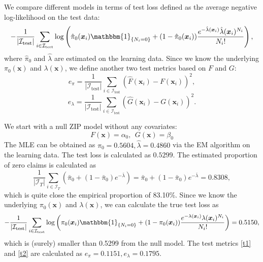 \documentclass[11pt]{article}
\numberwithin{equation}{section}
\def\bx{\boldsymbol{x}}
\begin{document}
We compare different models in terms of test loss defined as the average negative log-likelihood on the test data:
\begin{equation}
-\frac{1}{|\mathcal{I}_\text{test}|}\sum_{i\in\mathcal{I}_\text{test}}\log \left(\hat{\pi}_0(\bx_i)\mathbbm{1}_{\{N_i=0\}} + 
(1-\hat{\pi}_0(\bx_i))\frac{e^{-\hat{\lambda}(\bx_i)}\hat{\lambda}(\bx_i)^{N_i}}{N_i!}\right),
\end{equation} 
where $\hat{\pi}_0$ and $\hat{\lambda}$ are estimated on the learning data. 
Since we know the underlying $\pi_0(\bx)$ and $\lambda(\bx)$, we define another two test metrics based on $F$ and $G$:
\begin{equation}\label{t1}
e_\pi=\frac{1}{|\mathcal{I}_\text{test}|}\sum_{i\in\mathcal{I}_\text{test}}(\hat{F}(\bx_i)-F(\bx_i))^2,
\end{equation}
\begin{equation}\label{t2}
e_\lambda=\frac{1}{|\mathcal{I}_\text{test}|}\sum_{i\in\mathcal{I}_\text{test}}(\hat{G}(\bx_i)-G(\bx_i))^2.
\end{equation}


We start with a null ZIP model without any covariates:
\begin{equation}\label{zip-null}
F(\bx)=\alpha_0, ~~G(\bx)=\beta_0 
\end{equation}
The MLE can be obtained as $\hat{\pi}_0=0.5604, \hat{\lambda}=0.4860$ via the EM algorithm on the learning data.
The test loss is calculated as $0.5299$. 
The estimated proportion of zero claims is calculated as 
$$\frac{1}{|\mathcal{I}_T|}\sum_{i\in\mathcal{I}_T}\left(\bar{\pi}_0+(1-\bar{\pi}_0)e^{-\bar{\lambda}}\right)=\bar{\pi}_0+(1-\bar{\pi}_0)e^{-\bar{\lambda}}=0.8308,$$
which is quite close the empirical proportion of 83.10\%.
Since we know the underlying $\pi_0(\bx)$ and $\lambda(\bx)$, we can calculate the true test loss as 
\begin{equation}
	-\frac{1}{|\mathcal{I}_\text{test}|}\sum_{i\in\mathcal{I}_\text{test}}\log \left({\pi}_0(\bx_i)\mathbbm{1}_{\{N_i=0\}} + 
	(1-{\pi}_0(\bx_i))\frac{e^{-{\lambda}(\bx_i)}{\lambda}(\bx_i)^{N_i}}{N_i!}\right)=0.5150,
\end{equation}   
which is (surely) smaller than 0.5299 from the null model.
The test metrics \eqref{t1} and \eqref{t2} are calculated as $e_\pi=0.1151, e_\lambda=0.1795$.
\end{document}
